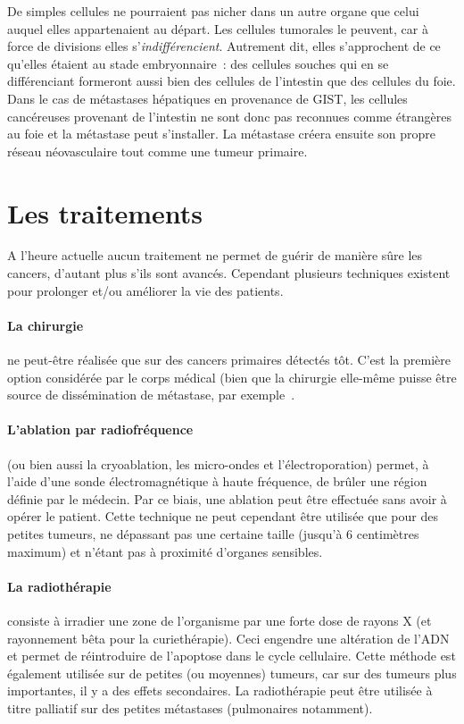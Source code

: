 \documentclass[main.tex]{subfiles}
\begin{document}
De simples cellules ne pourraient pas nicher dans un autre organe que celui auquel elles appartenaient au départ. Les cellules tumorales le peuvent, car à force de divisions elles s'\emph{indifférencient}. Autrement dit, elles s'approchent de ce qu'elles étaient au stade embryonnaire~: des cellules souches qui en se différenciant formeront aussi bien des cellules de l'intestin que des cellules du foie. Dans le cas de métastases hépatiques en provenance de GIST, les cellules cancéreuses provenant de l'intestin ne sont donc pas reconnues comme étrangères au foie et la métastase peut s'installer. La métastase créera ensuite son propre réseau néovasculaire tout comme une tumeur primaire.

\section{Les traitements}
A l'heure actuelle aucun traitement ne permet de guérir de manière sûre les cancers, d'autant plus s'ils sont avancés. Cependant plusieurs techniques existent pour prolonger et/ou améliorer la vie des patients.
\paragraph{La chirurgie} ne peut-être réalisée que sur des cancers primaires %
détectés tôt. C'est la première option considérée par le corps médical (bien que la chirurgie elle-même puisse être source de dissémination de métastase, \cf par exemple~\cite{topal2005cancer}.

\paragraph{L'ablation par radiofréquence} (ou bien aussi la cryoablation, les micro-ondes et l'électroporation) permet, à l'aide d'une sonde électromagnétique à haute fréquence, de brûler une région définie par le médecin. Par ce biais, une ablation peut être effectuée sans avoir à opérer le patient. 
Cette technique ne peut cependant être utilisée que pour des petites tumeurs, ne dépassant pas une certaine taille (jusqu'à 6 centimètres maximum) et n'étant pas à proximité d'organes sensibles. 

\paragraph{La radiothérapie} consiste à irradier une zone de l'organisme par une forte dose de rayons X (et rayonnement bêta pour la curiethérapie). 
Ceci engendre une altération de l'ADN et permet de réintroduire de l'apoptose dans le cycle cellulaire. 
Cette méthode est également utilisée sur de petites (ou moyennes) tumeurs, car sur des tumeurs plus importantes, il y a des effets secondaires. 
La radiothérapie peut être %
utilisée à titre palliatif sur des petites métastases (pulmonaires notamment).
\end{document}
